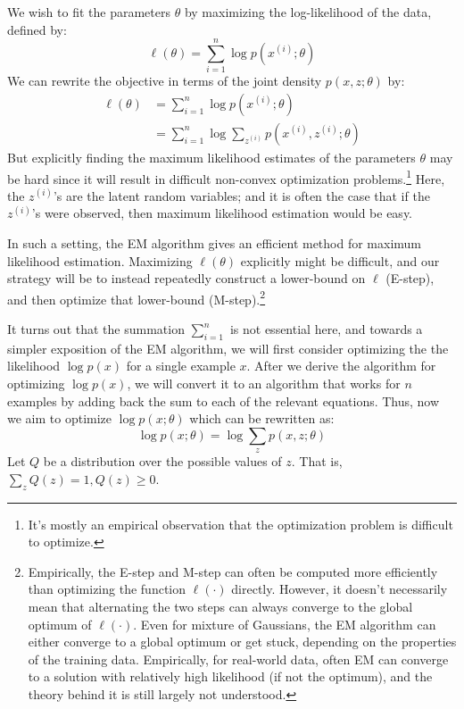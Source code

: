 We wish to fit the parameters $\theta$ by maximizing the log-likelihood of the
data, defined by:
\begin{equation}
    \ell(\theta) = \sum_{i=1}^n \log p(x^{(i)} ;\theta)
\end{equation}
We can rewrite the objective in terms of the joint density $p(x,z;\theta)$ by:
\begin{align}
\ell(\theta) &= \sum_{i=1}^n \log p(x^{(i)} ;\theta)\\
    &= \sum_{i=1}^n \log \sum_{z^{(i)}} p(x^{(i)} ,z^{(i)} ;\theta)
\end{align}
But explicitly finding the maximum likelihood estimates of the parameters %
$\theta$ may be hard since it will result in difficult non-convex optimization
problems.\footnote{
It's mostly an empirical observation that the optimization problem is difficult to optimize.}
Here, the $z^{(i)}$'s are the latent random variables; and it is often the case
that if the $z^{(i)}$'s were observed, then maximum likelihood estimation would
be easy.

In such a setting, the EM algorithm gives an efficient method for
maximum likelihood estimation. Maximizing $\ell(\theta)$ explicitly might be difficult,
and our strategy will be to instead repeatedly construct a lower-bound on $\ell$
(E-step), and then optimize that lower-bound (M-step).\footnote{
Empirically, the E-step and M-step can often be computed more efficiently than
optimizing the function $\ell(\cdot)$ directly. However, it doesn't necessarily mean that alternating
the two steps can always converge to the global optimum of $\ell(\cdot)$. Even for mixture of
Gaussians, the EM algorithm can either converge to a global optimum or get stuck,
depending on the properties of the training data. Empirically, for real-world data, often EM
can converge to a solution with relatively high likelihood (if not the optimum), and the
theory behind it is still largely not understood.    
}

It turns out that the summation $\sum^n_{i=1}$ is not essential here, and towards a
simpler exposition of the EM algorithm, we will first consider optimizing the
the likelihood $\log p(x)$ for a single example $x$. After we derive the algorithm
for optimizing $\log p(x)$, we will convert it to an algorithm that works for $n$
examples by adding back the sum to each of the relevant equations. Thus,
now we aim to optimize $\log p(x;\theta)$ which can be rewritten as:
\begin{equation}
    \log p(x;\theta) = \log \sum_{z} p(x,z;\theta)
\end{equation}
Let $Q$ be a distribution over the possible values of $z$. That is, $\sum_z Q(z) = 1, Q(z) \ge 0$. %

